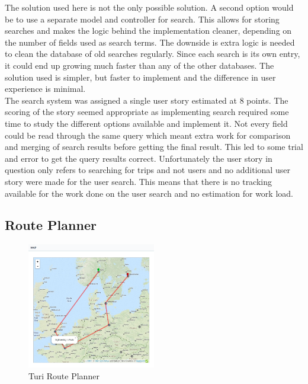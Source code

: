 \documentclass[a4paper]{article}
\begin{document}
\noindent
The solution used here is not the only possible solution. A second option would be to use a separate model and controller for search. This allows for storing searches and makes the logic behind the implementation cleaner, depending on the number of fields used as search terms. The downside is extra logic is needed to clean the database of old searches regularly. Since each search is its own entry, it could end up growing much faster than any of the other databases. The solution used is simpler, but faster to implement and the difference in user experience is minimal.\\

\noindent
The search system was assigned a single user story estimated at 8 points. The scoring of the story seemed appropriate as implementing search required some time to study the different options available and implement it. Not every field could be read through the same query which meant extra work for comparison and merging of search results before getting the final result. This led to some trial and error to get the query results correct. Unfortunately the user story in question only refers to searching for trips and not users and no additional user story were made for the user search. This means that there is no tracking available for the work done on the user search and no estimation for work load.


\subsection{Route Planner}

\begin{figure}[h]
  \begin{center}
    \includegraphics[width=0.5\textwidth]{pictures/route_planning}
  \end{center}
\caption{Turi Route Planner}
\label{fig:route}
\end{figure} 
\end{document}
